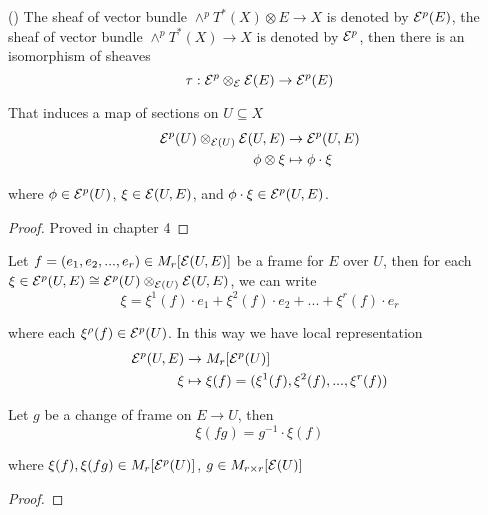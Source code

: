 \begin{proposition}
	()
	The sheaf of vector bundle $\wedge^p T^*(X) \otimes E \to X$ is denoted by $\mathcal{E}^p(E)$, the sheaf of vector bundle $\wedge^p T^*(X) \to X$ is denoted by $\mathcal{E}^p$, then there is an isomorphism of sheaves
	$$
	\tau: \mathcal{E}^p \otimes_{\mathcal{E}} \mathcal{E}(E) \to \mathcal{E}^p(E)
	$$
	
	That induces a map of sections on $U \subseteq X$
	\begin{align*}
		\mathcal{E}^p(U) \otimes_{\mathcal{E}(U)} \mathcal{E}(U, E) &\to \mathcal{E}^p(U, E) \\
		\phi \otimes \xi &\mapsto \phi \cdot \xi 
	\end{align*}
	
	where $\phi \in \mathcal{E}^p(U)$, $\xi \in \mathcal{E}(U, E)$, and $\phi \cdot \xi \in \mathcal{E}^p(U, E)$.
	
	\begin{proof}
		Proved in chapter 4
	\end{proof}
\end{proposition}

\begin{remark}
	Let $f = (e_1, e_2, ..., e_r) \in M_r[\mathcal{E}(U, E)]$ be a frame for $E$ over $U$, then for each $\xi \in \mathcal{E}^p(U, E) \cong \mathcal{E}^p(U) \otimes_{\mathcal{E}(U)} \mathcal{E}(U, E)$, we can write
	$$
	\xi = \xi^1(f) \cdot e_1 + \xi^2(f) \cdot e_2 + ... + \xi^r(f) \cdot e_r
	$$
	
	where each $\xi^\rho(f) \in \mathcal{E}^p(U)$. In this way we have local representation 
	\begin{align*}
		\mathcal{E}^p(U, E) &\to M_r[\mathcal{E}^p(U)] \\
		\xi &\mapsto \xi(f) = (\xi^1(f), \xi^2(f), ..., \xi^r(f))
	\end{align*}
\end{remark}

\begin{proposition}
	Let $g$ be a change of frame on $E \to U$, then
	$$
	\xi(fg) = g^{-1} \cdot \xi(f)
	$$
	
	where $\xi(f), \xi(fg) \in M_r[\mathcal{E}^p(U)]$, $g \in M_{r \times r}[\mathcal{E}(U)]$
	\begin{proof}
	\end{proof}
\end{proposition}